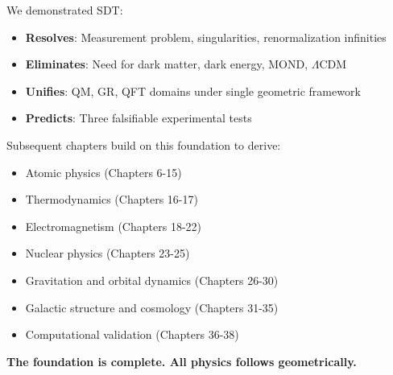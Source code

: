 We demonstrated SDT:

\begin{itemize}
\item \textbf{Resolves}: Measurement problem, singularities, renormalization infinities
\item \textbf{Eliminates}: Need for dark matter, dark energy, MOND, $\Lambda$CDM
\item \textbf{Unifies}: QM, GR, QFT domains under single geometric framework
\item \textbf{Predicts}: Three falsifiable experimental tests
\end{itemize}

Subsequent chapters build on this foundation to derive:

\begin{itemize}
\item Atomic physics (Chapters 6-15)
\item Thermodynamics (Chapters 16-17)
\item Electromagnetism (Chapters 18-22)
\item Nuclear physics (Chapters 23-25)
\item Gravitation and orbital dynamics (Chapters 26-30)
\item Galactic structure and cosmology (Chapters 31-35)
\item Computational validation (Chapters 36-38)
\end{itemize}

\textbf{The foundation is complete. All physics follows geometrically.}




